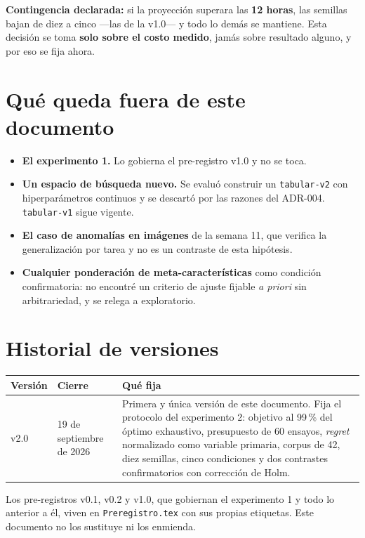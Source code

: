 \documentclass[11pt,letterpaper]{article}
\newcommand{\preregversion}{v2.0}
\newcommand{\preregfecha}{19 de septiembre de 2026}
\begin{document}
\textbf{Contingencia declarada:} si la proyección superara las \textbf{12 horas}, las
semillas bajan de diez a cinco ---las de la v1.0--- y todo lo demás se mantiene. Esta
decisión se toma \textbf{solo sobre el costo medido}, jamás sobre resultado alguno, y
por eso se fija ahora.

\section{Qué queda fuera de este documento}
\label{sec:fuera}

\begin{itemize}
  \item \textbf{El experimento 1.} Lo gobierna el pre-registro v1.0 y no se toca.
  \item \textbf{Un espacio de búsqueda nuevo.} Se evaluó construir un
        \texttt{tabular-v2} con hiperparámetros continuos y se descartó por las
        razones del ADR-004. \texttt{tabular-v1} sigue vigente.
  \item \textbf{El caso de anomalías en imágenes} de la semana 11, que verifica la
        generalización por tarea y no es un contraste de esta hipótesis.
  \item \textbf{Cualquier ponderación de meta-características} como condición
        confirmatoria: no encontré un criterio de ajuste fijable \emph{a priori} sin
        arbitrariedad, y se relega a exploratorio.
\end{itemize}

\section{Historial de versiones}
\label{sec:historial}

\begin{center}
\begin{tabularx}{\textwidth}{L{1.5cm} L{3.0cm} Y}
\toprule
{} \textbf{Versión} & \textbf{Cierre} & \textbf{Qué fija} \\
\midrule
\preregversion & \preregfecha &
Primera y única versión de este documento. Fija el protocolo del experimento 2:
objetivo al 99\,\% del óptimo exhaustivo, presupuesto de 60 ensayos, \emph{regret}
normalizado como variable primaria, corpus de 42, diez semillas, cinco condiciones y
dos contrastes confirmatorios con corrección de Holm. \\
\bottomrule
\end{tabularx}
\end{center}

\vspace{4pt}
{\small\color{gris} Los pre-registros v0.1, v0.2 y v1.0, que gobiernan el experimento
1 y todo lo anterior a él, viven en \texttt{Preregistro.tex} con sus propias
etiquetas. Este documento no los sustituye ni los enmienda.\par}
\end{document}
